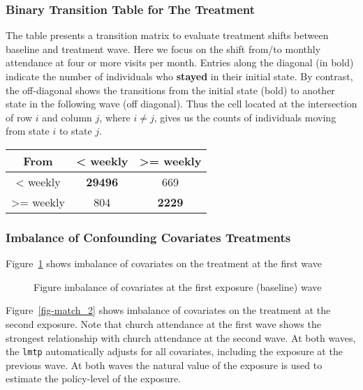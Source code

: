 \documentclass[
  single column]{article}
\begin{document}
\subsubsection{Binary Transition Table for The
Treatment}\label{binary-transition-table-for-the-treatment}

The table presents a transition matrix to evaluate treatment shifts
between baseline and treatment wave. Here we focus on the shift from/to
monthly attendance at four or more visits per month. Entries along the
diagonal (in bold) indicate the number of individuals who
\textbf{stayed} in their initial state. By contrast, the off-diagonal
shows the transitions from the initial state (bold) to another state in
the following wave (off diagonal). Thus the cell located at the
intersection of row \(i\) and column \(j\), where \(i \neq j\), gives us
the counts of individuals moving from state \(i\) to state \(j\).

\begin{longtable}[]{@{}ccc@{}}
\toprule\noalign{}
From & \textless{} weekly & \textgreater= weekly \\
\midrule\noalign{}
\endhead
\bottomrule\noalign{}
\endlastfoot
\textless{} weekly & \textbf{29496} & 669 \\
\textgreater= weekly & 804 & \textbf{2229} \\
\end{longtable}

\subsubsection{Imbalance of Confounding Covariates
Treatments}\label{imbalance-of-confounding-covariates-treatments}

Figure~\ref{fig-match_1} shows imbalance of covariates on the treatment
at the first wave

\begin{figure}


\caption{\label{fig-match_1}Figure imbalance of covariates at the first
exposure (baseline) wave}

\end{figure}%

Figure~\ref{fig-match_2} shows imbalance of covariates on the treatment
at the second exposure. Note that church attendance at the first wave
shows the strongest relationship with church attendance at the second
wave. At both waves, the \texttt{lmtp} automatically adjusts for all
covariates, including the exposure at the previous wave. At both waves
the natural value of the exposure is used to estimate the policy-level
of the exposure.
\end{document}
